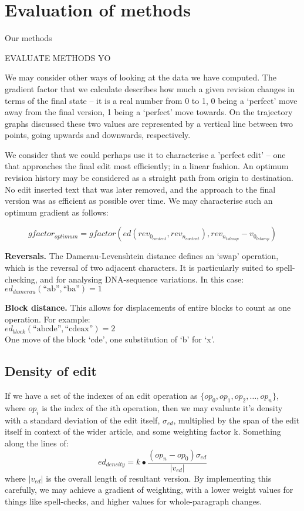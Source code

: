 \section{Evaluation of methods}
Our methods 

EVALUATE METHODS YO \label{split-distance-eval}

We may consider other ways of looking at the data we have
computed. The gradient factor that we calculate describes how much a
given revision changes in terms of the final state -- it is a real
number from 0 to 1, 0 being a `perfect' move away from the final
version, 1 being a `perfect' move towards. On the trajectory graphs
discussed these two values are represented by a vertical line between
two points, going upwards and downwards, respectively. 

We consider that we could perhaps use it to characterise a 'perfect
edit' -- one that approaches the final edit most efficiently; in a
linear fashion. An optimum revision history may be considered as a
straight path from origin to destination. No edit inserted text that
was later removed, and the approach to the final version was as
efficient as possible over time. We may characterise such an optimum
gradient as follows:


\[
  gfactor_{optimum} = gfactor(ed(rev_{0_{content}},
  rev_{n_{content}}), rev_{n_{tstamp}} - v_{0_{tstamp}})
\]


\textbf{Reversals.} The Damerau-Levenshtein distance defines an `swap'
operation, which is the reversal of two adjacent characters. It is
particularly suited to spell-checking, and for analysing DNA-sequence
variations. In this case:\\ $ed_{damerau}(\text{``ab''},\text{``ba''})
= 1$

\textbf{Block distance.} This allows for displacements of entire
blocks to count as one operation. For
example:\\ $ed_{block}(\text{``abcde''},\text{``cdeax''})= 2$ \\ One
move of the block `cde', one substitution of `b' for
`x'.\cite{Tichy1984}

\subsection*{Density of edit}

If we have a set of the indexes of an edit operation as
$\{op_0,op_1,op_2,\dots, op_n\}$, where $op_i$ is the index of the
$i$th operation, then we may evaluate it's density with a standard
deviation of the edit itself, $\sigma_{ed}$, multiplied by the span of
the edit itself in context of the wider article, and some weighting
factor k. Something along the lines of:
$$ed_{density} = k\bullet\frac{(op_n - op_0)\sigma_{ed}}{|v_{ed}|}$$
where $|v_{ed}|$ is the overall length of resultant version. By
implementing this carefully, we may achieve a gradient of weighting,
with a lower weight values for things like spell-checks, and higher
values for whole-paragraph changes.

